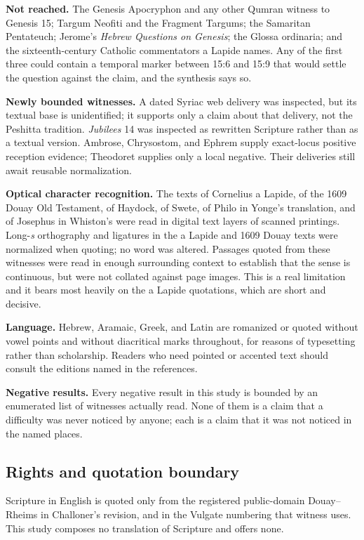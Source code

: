 \textbf{Not reached.} The Genesis Apocryphon and any other Qumran
witness to Genesis 15; Targum Neofiti and the Fragment Targums; the Samaritan
Pentateuch; Jerome's \textit{Hebrew Questions on Genesis}; the Glossa ordinaria;
and the sixteenth-century Catholic commentators a Lapide names. Any of the
first three could contain a
temporal marker between 15:6 and 15:9 that would settle the question against the
claim, and the synthesis says so.

\textbf{Newly bounded witnesses.} A dated Syriac web delivery was inspected,
but its textual base is unidentified; it supports only a claim about that
delivery, not the Peshitta tradition. \textit{Jubilees} 14 was inspected as
rewritten Scripture rather than as a textual version. Ambrose, Chrysostom, and
Ephrem supply exact-locus positive reception evidence; Theodoret supplies only
a local negative. Their deliveries still await reusable normalization.

\textbf{Optical character recognition.} The texts of Cornelius a Lapide, of the
1609 Douay Old Testament, of Haydock, of Swete, of Philo in Yonge's translation,
and of Josephus in Whiston's were read in digital text layers of scanned
printings. Long-\textit{s} orthography and ligatures in the a Lapide and 1609
Douay texts were normalized when quoting; no word was altered. Passages quoted
from these witnesses were read in enough surrounding context to establish that
the sense is continuous, but were not collated against page images. This is a
real limitation and it bears most heavily on the a Lapide quotations, which are
short and decisive.

\textbf{Language.} Hebrew, Aramaic, Greek, and Latin are romanized or quoted
without vowel points and without diacritical marks throughout, for reasons of
typesetting rather than scholarship. Readers who need pointed or accented text
should consult the editions named in the references.

\textbf{Negative results.} Every negative result in this study is bounded by an
enumerated list of witnesses actually read. None of them is a claim that a
difficulty was never noticed by anyone; each is a claim that it was not noticed
in the named places.

\subsection{Rights and quotation boundary}

Scripture in English is quoted only from the registered public-domain
Douay--Rheims in Challoner's revision, and in the Vulgate numbering that witness
uses. This study composes no translation of Scripture and offers none.

